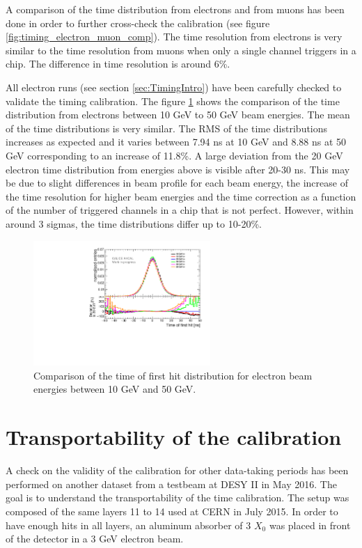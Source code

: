 A comparison of the time distribution from electrons and from muons has been done in order to further cross-check the calibration (see figure \ref{fig:timing_electron_muon_comp}). The time resolution from electrons is very similar to the time resolution from muons when only a single channel triggers in a chip. The difference in time resolution is around 6\%.

All electron runs (see section \ref{sec:TimingIntro}) have been carefully checked to validate the timing calibration. The figure \ref{fig:all_electron_energies} shows the comparison of the time distribution from electrons between 10 GeV to 50 GeV beam energies. The mean of the time distributions is very similar. The RMS of the time distributions increases as expected and it varies between 7.94 ns at 10 GeV and 8.88 ns at 50 GeV corresponding to an increase of 11.8\%. A large deviation from the 20 GeV electron time distribution from energies above is visible after 20-30 ns. This may be due to slight differences in beam profile for each beam energy, the increase of the time resolution for higher beam energies and the time correction as a function of the number of triggered channels in a chip that is not perfect. However, within around 3 sigmas, the time distributions differ up to 10-20\%.

\begin{figure}[htbp!]
	\centering
	\includegraphics[width=0.6\textwidth]{../Thesis_Plots/Timing/Electrons/Plots/ComparisonDataEnergies.pdf}
	\caption{Comparison of the time of first hit distribution for electron beam energies between 10 GeV and 50 GeV.}
	\label{fig:all_electron_energies}
\end{figure}

\section{Transportability of the calibration}

A check on the validity of the calibration for other data-taking periods has been performed on another dataset from a testbeam at DESY II in May 2016. The goal is to understand the transportability of the time calibration. The setup was composed of the same layers 11 to 14 used at CERN in July 2015. In order to have enough hits in all layers, an aluminum absorber of 3 $X_{0}$ was placed in front of the detector in a 3 GeV electron beam.

